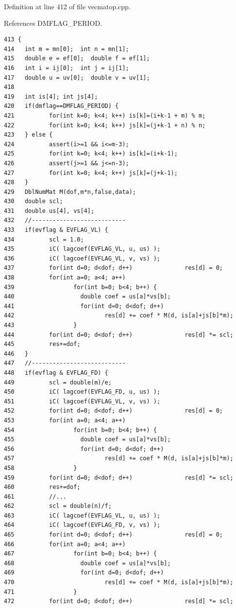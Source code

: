 Definition at line 412 of file vecmatop.cpp.

References DMFLAG\_\-PERIOD.

\footnotesize\begin{verbatim}413 {
414   int m = mn[0];  int n = mn[1];
415   double e = ef[0];  double f = ef[1];
416   int i = ij[0];  int j = ij[1];
417   double u = uv[0];  double v = uv[1];
418   
419   int is[4]; int js[4];
420   if(dmflag==DMFLAG_PERIOD) {
421          for(int k=0; k<4; k++) is[k]=(i+k-1 + m) % m;
422          for(int k=0; k<4; k++) js[k]=(j+k-1 + n) % n;
423   } else {
424          assert(i>=1 && i<=m-3);
425          for(int k=0; k<4; k++) is[k]=(i+k-1);
426          assert(j>=1 && j<=n-3);
427          for(int k=0; k<4; k++) js[k]=(j+k-1);
428   }
429   DblNumMat M(dof,m*n,false,data);
430   double scl; 
431   double us[4], vs[4];
432   //---------------------------
433   if(evflag & EVFLAG_VL) {
434          scl = 1.0;
435          iC( lagcoef(EVFLAG_VL, u, us) );
436          iC( lagcoef(EVFLAG_VL, v, vs) );
437          for(int d=0; d<dof; d++)               res[d] = 0;
438          for(int a=0; a<4; a++)
439                 for(int b=0; b<4; b++) {
440                   double coef = us[a]*vs[b]; 
441                   for(int d=0; d<dof; d++)
442                          res[d] += coef * M(d, is[a]+js[b]*m);
443                 }
444          for(int d=0; d<dof; d++)               res[d] *= scl;
445          res+=dof;
446   }
447   //---------------------------
448   if(evflag & EVFLAG_FD) {
449          scl = double(m)/e;
450          iC( lagcoef(EVFLAG_FD, u, us) );
451          iC( lagcoef(EVFLAG_VL, v, vs) );
452          for(int d=0; d<dof; d++)               res[d] = 0;
453          for(int a=0; a<4; a++)
454                 for(int b=0; b<4; b++) {
455                   double coef = us[a]*vs[b];
456                   for(int d=0; d<dof; d++)
457                          res[d] += coef * M(d, is[a]+js[b]*m);
458                 }
459          for(int d=0; d<dof; d++)               res[d] *= scl;
460          res+=dof;
461          //...
462          scl = double(n)/f;
463          iC( lagcoef(EVFLAG_VL, u, us) );
464          iC( lagcoef(EVFLAG_FD, v, vs) );
465          for(int d=0; d<dof; d++)               res[d] = 0;
466          for(int a=0; a<4; a++)
467                 for(int b=0; b<4; b++) {
468                   double coef = us[a]*vs[b]; 
469                   for(int d=0; d<dof; d++)
470                          res[d] += coef * M(d, is[a]+js[b]*m);
471                 }
472          for(int d=0; d<dof; d++)               res[d] *= scl;

\end{verbatim}
